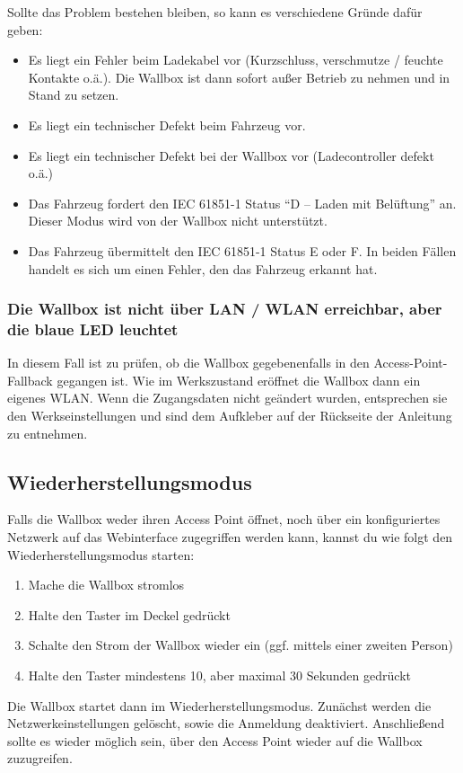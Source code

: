 \documentclass[a4paper,10pt]{article}
\begin{document}
\begin{multicols*}{2}
    Sollte das Problem bestehen bleiben, so kann es verschiedene Gründe dafür
    geben:
    \begin{itemize}
        \item Es liegt ein Fehler beim Ladekabel vor (Kurzschluss, verschmutze / feuchte
              Kontakte o.ä.). Die Wallbox ist dann sofort außer Betrieb zu nehmen und
              in Stand zu setzen.
        \item Es liegt ein technischer Defekt beim Fahrzeug vor.
        \item Es liegt ein technischer Defekt bei der Wallbox vor (Ladecontroller defekt o.ä.)
        \item Das Fahrzeug fordert den IEC 61851-1 Status \enquote{D – Laden mit Belüftung}
              an. Dieser Modus wird von der Wallbox nicht unterstützt.
        \item Das Fahrzeug übermittelt den IEC 61851-1 Status E oder F. In beiden Fällen
              handelt es sich um einen Fehler, den das Fahrzeug erkannt hat.
    \end{itemize}

    \subsubsection*{Die Wallbox ist nicht über LAN / WLAN erreichbar, aber die blaue LED leuchtet}
    In diesem Fall ist zu prüfen, ob die Wallbox gegebenenfalls in den Access-Point-Fallback
    gegangen ist. Wie im Werkszustand eröffnet die Wallbox dann ein eigenes
    WLAN. Wenn die Zugangsdaten nicht geändert wurden, entsprechen sie den Werkseinstellungen und sind dem
    Aufkleber auf der Rückseite der Anleitung zu entnehmen.


    \subsection{Wiederherstellungsmodus}\label{recovery}
    Falls die Wallbox weder ihren Access Point öffnet, noch über ein konfiguriertes Netzwerk auf das Webinterface zugegriffen werden kann,
    kannst du wie folgt den Wiederherstellungsmodus starten:
    \begin{enumerate}
     \item Mache die Wallbox stromlos
     \item Halte den Taster im Deckel gedrückt
     \item Schalte den Strom der Wallbox wieder ein (ggf. mittels einer zweiten Person)
     \item Halte den Taster mindestens 10, aber maximal 30 Sekunden gedrückt
    \end{enumerate}
    Die Wallbox startet dann im Wiederherstellungsmodus. Zunächst werden die Netzwerkeinstellungen gelöscht, sowie die Anmeldung deaktiviert.
    Anschließend sollte es wieder möglich sein, über den Access Point wieder auf die Wallbox zuzugreifen.


\end{multicols*}
\end{document}
